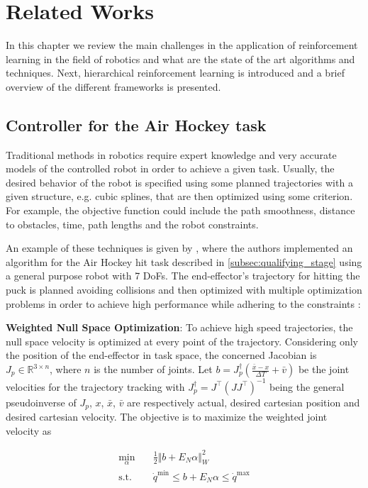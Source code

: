 \chapter{Related Works}
\label{ch:related_works}
In this chapter we review the main challenges in the application of reinforcement learning in the
field of robotics and what are the state of the art algorithms and techniques. 
Next, hierarchical reinforcement learning is introduced and a brief overview of the different frameworks is presented.

\section{Controller for the Air Hockey task}
\label{sec:baseline}
Traditional methods in robotics require expert knowledge and very accurate models of the controlled robot in order to achieve a given task.
Usually, the desired behavior of the robot is specified using some planned trajectories with a given structure, e.g. cubic splines, that are then optimized
using some criterion. For example, the objective function could include the path smoothness, distance to obstacles, time, path lengths and the robot constraints.

An example of these techniques is given by \cite{baseline}, where the authors implemented an algorithm for the Air Hockey hit task described in \ref{subsec:qualifying_stage} using a general purpose robot with 7 DoFs.
The end-effector's trajectory for hitting the puck is planned avoiding collisions and then optimized with multiple optimization problems in order to achieve high
performance while adhering to the constraints :

\textbf{Weighted Null Space Optimization}:
To achieve high speed trajectories, the null space velocity is optimized at every point of the trajectory. Considering only the position of the end-effector in task space,
the concerned Jacobian is $J_p \in \mathbb{R}^{3\times n}$, where $n$ is the number of joints. Let $b = J^\dag_p\left(\frac{\bar{x} - x}{\Delta T} + \bar{v}\right)$
be the joint velocities for the trajectory tracking with $J_p^\dag = J^\intercal\left(J J^\intercal\right)^{-1}$ being the general pseudoinverse of $J_p$, $x$, $\bar{x}$, $\bar{v}$ are respectively actual, desired cartesian position and desired cartesian velocity.
The objective is to maximize the weighted joint velocity as

\begin{equation*}
    \begin{aligned}
        \min_\alpha  \quad&\frac{1}{2} \Vert b + E_N \alpha \Vert^{2}_W \\
        \text{s.t.}  \quad&\dot{q}^{\min} \le b + E_N \alpha \le \dot{q}^{\max}
    \end{aligned}
\end{equation*}

